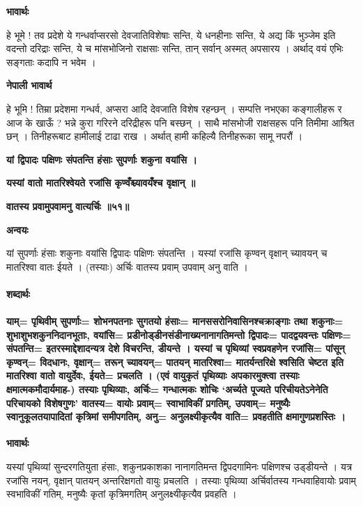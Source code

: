 \documentclass[11pt, a5paper]{article}
\begin{document}
\textbf{भावार्थः}

हे भूमे ! तव प्रदेशे ये गन्धर्वाप्सरसो देवजातिविशेषाः सन्ति, ये धनहीनाः सन्ति, ये अद्य किं भुञ्जेम इति वदन्तो दरिद्राः सन्ति, ये च मांसभोजिनो राक्षसाः सन्ति, तान् सर्वान् अस्मत् अपसारय । अर्थाद् वयं एभिः सङ्‍गताः कदापि न भवेम ।

\textbf{नेपाली भावार्थ}

हे भूमि ! तिम्रा प्रदेशमा गन्धर्व, अप्सरा आदि देवजाति विशेष रहन्छन् । सम्पत्ति नभएका कङ्गालीहरू र आज के खाऊँ ? भन्ने कुरा गरिरने दरिद्रीहरू पनि बस्छन् । साथै मांसभोजी राक्षसहरू पनि तिमीमा आश्रित छन् । तिनीहरूबाट हामीलाई टाढा राख । अर्थात् हामी कहिल्यै तिनीहरूका सामू नपरौं ।

\textbf{यां द्विपादः पक्षिणः संपतन्ति हंसाः सुपर्णाः शकुना वयांसि ।}

\textbf{यस्यां वातो मातरिश्वेयते रजांसि कृण्वँश्च्यावयँश्च वृक्षान् ॥}

\textbf{वातस्य प्रवामुपवामनु वात्यर्चिः ॥५१॥}

\textbf{अन्वयः}

यां सुपर्णाः हंसाः शकुनाः वयांसि द्विपादः पक्षिणः संपतन्ति । यस्यां रजांसि कृण्वन् वृक्षान् च्यावयन् च मातरिश्वा वातः ईयते । (तस्याः) अर्चिः वातस्य प्रवाम् उपवाम् अनु वाति ।

\paragraph{\textbf{शब्दार्थः}}

\paragraph{याम्= पृथिवीम् सुपर्णाः= शोभनपतनाः सुगतयो हंसाः= मानससरोनिवासिनश्चक्राङ्‍गाः तथा शकुनाः= शुभाशुभशकुननिदानभूताः, वयांसि= प्रडीनोड्‍डीनसंडीनाख्यनानागतिमन्तो द्विपादः= पादद्वयवन्तः पक्षिणः= संपतन्ति= इतरस्माद्देशादन्यत्र देशे विचरन्ति, डीयन्ते । यस्यां च पृथिव्यां स्वप्रवहणेन रजांसि= पांसून् कृण्वन्= विदधानः, वृक्षान्= तरून् च्यावयन्= पातयन् मातरिश्वा= मातर्यन्तरिक्षे श्वसिति चेष्टत इति मातरिश्वा वातो वायुर्देवः, ईयते= प्रचलति । (एवं वायुकृतं पृथिव्याः अपकारमुक्त्वा तस्याः क्षमात्मकमौदार्यमाह-) तस्याः पृथिव्याः, अर्चिः= गन्धात्मकः शोचिः ‘अर्च्यते पूज्यते परिचीयतेऽनेनेति परिचायको विशेषगुणः’ वातस्य= वायोः प्रवाम्= स्वाभाविकीं प्रगतिम्, उपवाम्= मनुष्यैः स्वानुकूलतयापादितां कृत्रिमां समीपगतिम्, अनु= अनुलक्ष्यीकृत्यैव वाति= प्रवहतीति क्षमागुणप्रशस्तिः ।}

\textbf{भावार्थः}

यस्यां पृथिव्यां सुन्दरगतियुता हंसाः, शकुनप्रकाशका नानागतिमन्त द्विपदगामिनः पक्षिणश्च उड्‍डीयन्ते । यत्र रजांसि नयन्, वृक्षान् पातयन् अन्तरिक्षगतो वायुः प्रचलति । तस्याः पृथिव्या अर्चिर्वातस्य गन्धवाहिवायोः प्रवाम् स्वभाविकीं गतिम्, मनुष्यैः कृतां कृत्रिमगतिम् अनुलक्ष्यीकृत्यैव प्रवहति ।
\end{document}

